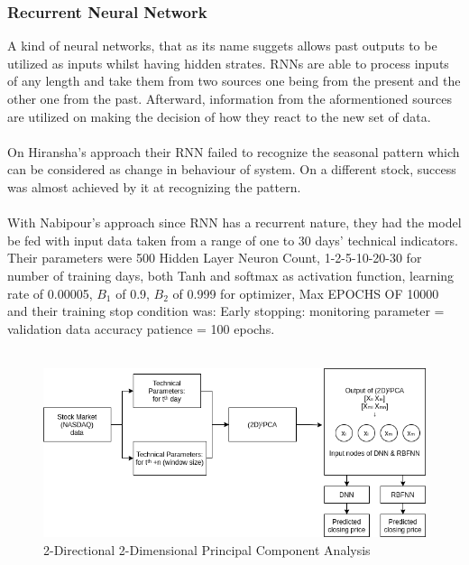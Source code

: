 \documentclass[conference]{IEEEtran}
\begin{document}
\subsubsection{Recurrent Neural Network}
A kind of neural networks, that as its name suggets allows past outputs to be utilized as inputs whilst having hidden strates. RNNs are able to process inputs of any length and take them from two sources one being from the present
and the other one from the past. Afterward, information from the aformentioned sources are utilized on making the decision of how they react to the new set of data.
\\\\
On Hiransha's approach \cite{M2018} their RNN failed to recognize the seasonal pattern which can be considered as change in behaviour of system. On a different stock, success was almost achieved by it at recognizing the pattern.
\\\\
With Nabipour's approach \cite{nabipour2020predicting} since RNN has a recurrent nature, they had the model be fed with input data taken from a range of one to 30 days' technical indicators. Their parameters were 500 Hidden Layer Neuron Count, 1-2-5-10-20-30 for number of training days, both Tanh and softmax as activation function, learning rate of 0.00005, $B_1$ of 0.9, $B_2$ of 0.999 for optimizer, Max EPOCHS OF 10000 and their training stop condition
was: Early stopping: monitoring parameter = validation data accuracy patience = 100 epochs. 
\\\\
\begin{figure}[htbp]
  \centerline{\includegraphics[scale=.65]{mapita2.png}}
  \caption{2-Directional 2-Dimensional Principal Component Analysis}
  \label{fig}
\end{figure}
\end{document}
